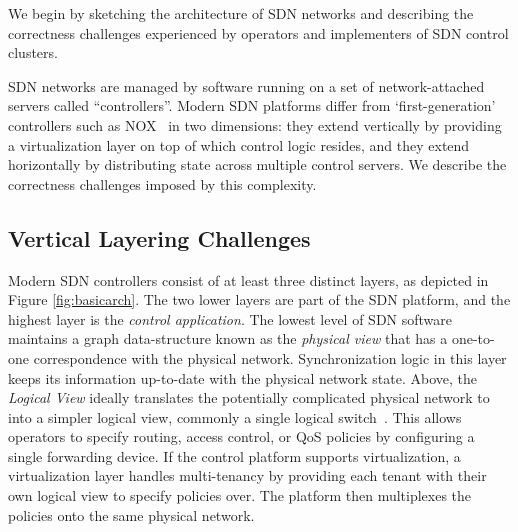 We begin by sketching the architecture of SDN networks and
describing the correctness challenges experienced by operators and
implementers of SDN control clusters.

SDN networks are managed by software running on a set of network-attached
servers called ``controllers''. Modern SDN platforms differ from
`first-generation' controllers such as NOX~\cite{nox} in two dimensions: they
extend vertically by providing a virtualization layer on top of which control
logic resides, and they extend horizontally by distributing state across
multiple control servers. We describe the correctness challenges imposed by
this complexity.



\subsection{Vertical Layering Challenges}

Modern SDN controllers consist of at least three distinct layers, as depicted in
Figure \ref{fig:basicarch}. The two lower layers are part of the SDN platform,
and the highest layer is the \emph{control application}. The lowest level of SDN
software maintains a graph data-structure known as the \emph{physical view}
that has a one-to-one correspondence with the physical network.
Synchronization logic in this layer keeps its information up-to-date with the
physical network state. Above, the \emph{Logical View} ideally translates the
potentially complicated physical network to into a simpler logical view, commonly a single
logical switch~\cite{Casado:2010:VNF:1921151.1921162}. This allows operators to
specify routing, access control, or QoS policies by configuring a single
forwarding device. If the control platform supports virtualization, a
virtualization layer handles multi-tenancy by providing each tenant with their
own logical view to specify policies over. The platform then multiplexes the
policies onto the same physical network.

